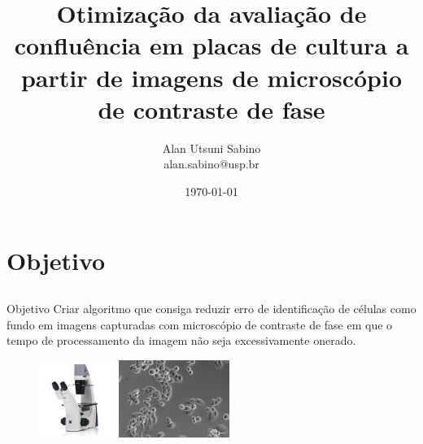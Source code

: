 \documentclass{beamer}
\title{Otimização da avaliação de confluência em placas de cultura a partir
 de imagens de microscópio de contraste de fase}
\author[Alan Sabino]{Alan Utsuni Sabino\\ {\tiny alan.sabino@usp.br}}
\institute[]
{
	\inst{}
	SIN5014 - Fundamentos de Processamento Gráfico \\
  Universidade de São Paulo
}
\date{\today}
\begin{document}
\label{Titulo}
{
  \begin{frame}
    \titlepage
  \end{frame}
}


\section{Objetivo}

\subsection{}
\begin{frame}{Objetivo}
  Criar algoritmo que consiga reduzir erro de identificação de células como
  fundo em imagens capturadas com microscópio de contraste de fase em que o
  tempo de processamento da imagem não seja excessivamente onerado.

  \begin{figure}
\includegraphics[width=0.22\textwidth]{imgs/micro.jpg}
\includegraphics[width=0.32\textwidth]{imgs/cell.jpg}
    \end{figure}
\end{frame}
\end{document}
